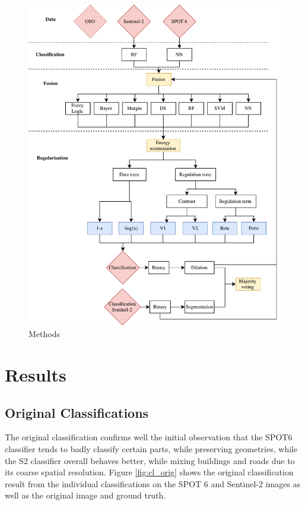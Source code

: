 \documentclass[10pt]{article}
\begin{document}
\begin{figure}[H]
    \centering
    \includegraphics[width=.7\textwidth]{IGN-methods}
    \caption{Methods}
    \label{fig:methods}
\end{figure}

\newpage

\section{Results}
\subsection{Original Classifications}
The original classification confirms well the initial observation that the SPOT6 classifier tends to badly classify certain parts, while preserving geometries, while the S2 classifier overall behaves better, while mixing buildings and roads due to its coarse spatial resolution. Figure \ref{fig:cl_orig} shows the original classification result from the individual classifications on the SPOT 6 and Sentinel-2 images as well as the original image and ground truth.\\
\end{document}
